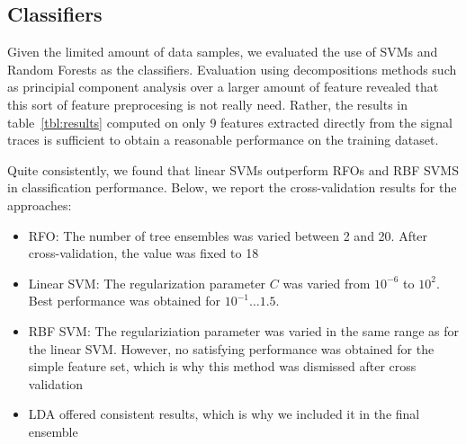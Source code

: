 \documentclass[10pt,a4paper]{article}
\begin{document}
\subsection{Classifiers}

Given the limited amount of data samples, we evaluated the use of SVMs and Random Forests as the classifiers.
Evaluation using decompositions methods such as principial component analysis over a larger amount of feature revealed that this sort of feature preprocesing is not really need.
Rather, the results in table~\ref{tbl:results} computed on only 9 features extracted directly from the signal traces is sufficient to obtain a reasonable performance on the training dataset.

Quite consistently, we found that linear SVMs outperform RFOs and RBF SVMS in classification performance.
Below, we report the cross-validation results for the approaches:

\begin{itemize}
    \item RFO: The number of tree ensembles was varied between 2 and 20.
    After cross-validation, the value was fixed to 18
    \item Linear SVM: The regularization parameter $C$ was varied from $10^{-6}$ to $10^2$.
    Best performance was obtained for $10^{-1} \dots 1.5$.
    \item RBF SVM: The regulariziation parameter was varied in the same range as for the linear SVM.
    However, no satisfying performance was obtained for the simple feature set, which is why this method
    was dismissed after cross validation
    \item LDA offered consistent results, which is why we included it in the final ensemble
\end{itemize}
\end{document}

